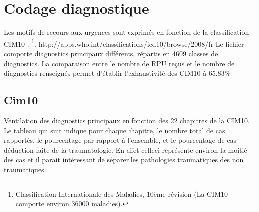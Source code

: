 \documentclass[12pt,english,french,twoside]{report}\usepackage[]{graphicx}\usepackage[]{color}
\begin{document}
\newpage
\chapter{Codage diagnostique}

%




Les motifs de recours aux urgences sont exprimés en fonction de la classification CIM10 \cite{10}.
\footnote{Classification Internationale des Maladies, 10ème révision (La CIM10 comporte environ 36000 maladies).}.
\url{http://apps.who.int/classifications/icd10/browse/2008/fr}
Le fichier comporte  diagnostics principaux différents.
répartis en 4609 classes de diagnostics.
La comparaison entre le nombre de RPU reçus et le nombre de diagnostics renseignés permet d'établir l'exhaustivité des CIM10 à 65.83\% 


\section{Cim10}

Ventilation des diagnostics principaux en fonction des 22 chapitres de la CIM10. Le tableau qui suit indique pour chaque chapitre, le nombre total de cas rapportés, le pourcentage par rapport à l'ensemble, et le pourcentage de cas déduction faite de la traumatologie. En effet celleci représente environ la moitié des cas et il parait intéressant de séparer les pathologies traumatiques des non traumatiques.





\end{document}
